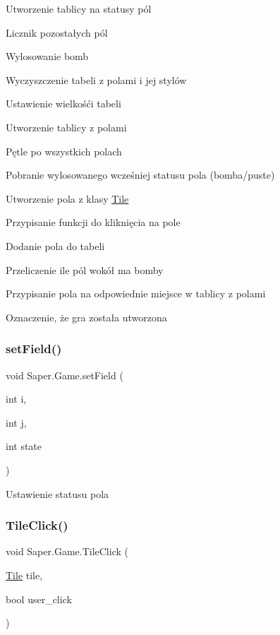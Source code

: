 Utworzenie tablicy na statusy pól

Licznik pozostałych pól

Wylosowanie bomb

Wyczyszczenie tabeli z polami i jej stylów

Ustawienie wielkośći tabeli

Utworzenie tablicy z polami

Pętle po wszystkich polach

Pobranie wylosowanego wcześniej statusu pola (bomba/puste)

Utworzenie pola z klasy \mbox{\hyperlink{class_saper_1_1_tile}{Tile}}

Przypisanie funkcji do kliknięcia na pole

Dodanie pola do tabeli

Przeliczenie ile pól wokół ma bomby

Przypisanie pola na odpowiednie miejsce w tablicy z polami

Oznaczenie, że gra została utworzona \mbox{\label{class_saper_1_1_game_aa62b5814c25458101aaf843271dcff83}} 
\subsubsection{\texorpdfstring{setField()}{setField()}}
{\footnotesize\ttfamily void Saper.\+Game.\+set\+Field (\begin{DoxyParamCaption}\item[{int}]{i,  }\item[{int}]{j,  }\item[{int}]{state }\end{DoxyParamCaption})}

Ustawienie statusu pola \mbox{\label{class_saper_1_1_game_ad7088e52259cb63a068213bf2856eebb}} 
\subsubsection{\texorpdfstring{TileClick()}{TileClick()}}
{\footnotesize\ttfamily void Saper.\+Game.\+Tile\+Click (\begin{DoxyParamCaption}\item[{\mbox{\hyperlink{class_saper_1_1_tile}{Tile}}}]{tile,  }\item[{bool}]{user\+\_\+click }\end{DoxyParamCaption})}

